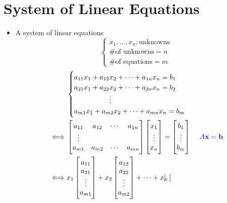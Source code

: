 \documentclass[12pt,openany]{book}
\theoremstyle{definition}
\begin{document}
	\section{System of Linear Equations}
	\begin{itemize}
		\item A system of linear equations
		\[
		\begin{cases}
			x_1,\dots,x_n:\text{unknowns}\\
			\text{\# of unknowns}=n\\
			\text{\# of equations}=m
		\end{cases}
		\]
		\begin{align*}
			&\begin{cases}
				a_{11}x_1+a_{12}x_2+\cdots+a_{1n}x_n=b_1\\
				a_{21}x_1+a_{22}x_2+\cdots+a_{2n}x_n=b_2\\
				\hspace{50pt}\vdots\\
				a_{m1}x_1+a_{m2}x_2+\cdots+a_{mn}x_n=b_m\\
			\end{cases}\\
			\iff&\begin{bmatrix}
				a_{11} & a_{12} & \cdots & a_{1n}\\
				\vdots \\
				a_{m1} & a_{m2} &\cdots & a_{mn}
			\end{bmatrix}\begin{bmatrix}
				x_1\\ \vdots \\ x_n
			\end{bmatrix}=\begin{bmatrix}
				b_1\\ \vdots \\ b_m
			\end{bmatrix} &\textcolor{blue}{A\textbf{x}=\textbf{b}}\\
			\iff& x_1\begin{bmatrix}
				a_{11}\\ a_{21}\\ \vdots\\ a_{m1}
			\end{bmatrix}+x_2\begin{bmatrix}
				a_{12}\\ a_{22}\\ \vdots\\ a_{m2}
			\end{bmatrix}+\cdots+x_n\begin{bmatrix}

\end{bmatrix}
\end{align*}
\end{itemize}
\end{document}
